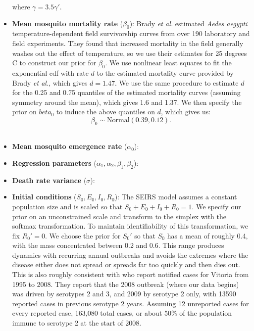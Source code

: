 \documentclass[12pt,letterpaper]{article}
\begin{document}
\begin{itemize}
where $\gamma = 3.5\gamma'$.
\\
\item \textbf{Mean mosquito mortality rate} ($\beta_0$): Brady \textit{et al.} \cite{Brady2013} estimated \textit{Aedes aegypti} temperature-dependent field survivorship curves from over 190 laboratory and field experiments.
They found that increased mortality in the field generally washes out the effect of temperature, so we use their estimates for 25 degrees C to construct our prior for $\beta_0$.  
We use nonlinear least squares to fit the exponential cdf with rate $d$ to the estimated mortality curve provided by Brady \textit{et al.}, which gives $d = 1.47$.
We use the same procedure to estimate $d$ for the 0.25 and 0.75 quantiles of the estimated mortality curves (assuming symmetry around the mean), which gives 1.6 and 1.37.
We then specify the prior on $beta_0$ to induce the above quantiles on $d$, which gives us:
\begin{equation}
\beta_0 \sim \text{Normal}(0.39, 0.12).
\end{equation}
\\
\item \textbf{Mean mosquito emergence rate} ($\alpha_0$):
\\
\item \textbf{Regression parameters} ($\alpha_1,\alpha_2,\beta_1,\beta_2$): 
\\
\item \textbf{Death rate variance} ($\sigma$):
\\
\item \textbf{Initial conditions} ($S_0, E_0, I_0, R_0$): The SEIRS model assumes a constant population size and is scaled so that $S_0+E_0+I_0+R_0 = 1$.
We specify our prior on an unconstrained scale and transform to the simplex with the softmax transformation.
To maintain identifiability of this transformation, we fix $R_0' = 0$.
We choose the prior for $S_0'$  so that $S_0$ has a mean of roughly  0.4, with the mass concentrated between 0.2 and 0.6.
This range produces dynamics with recurring annual outbreaks and avoids the extremes where the disease either does not spread or spreads far too quickly and then dies out.
This is also roughly consistent with \cite{Cardoso2011a} who report notified cases for Vitoria from 1995 to 2008. 
They report that the 2008 outbreak (where our data begins) was driven by serotypes 2 and 3, and 2009 by serotype 2 only, with 13590 reported cases in previous serotype 2 years.
Assuming 12 unreported cases for every reported case, 163,080 total cases, or about 50\% of the population immune to serotype 2 at the start of 2008.

\end{itemize}
\end{document}
